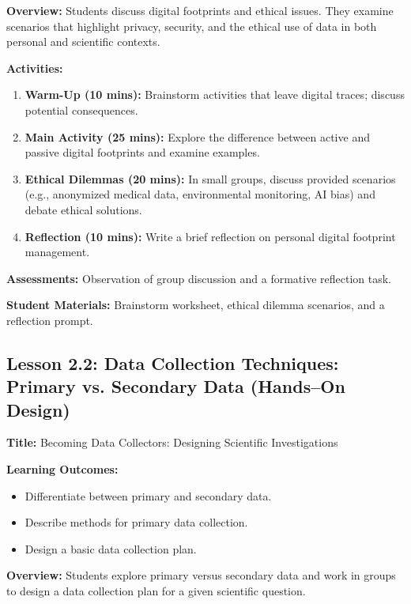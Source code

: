 \documentclass{tufte-book}
\begin{document}
\medskip
\textbf{Overview:}  
Students discuss digital footprints and ethical issues. They examine scenarios that highlight privacy, security, and the ethical use of data in both personal and scientific contexts.

\medskip
\textbf{Activities:}
\begin{enumerate}[label=\arabic*.]
    \item \textbf{Warm-Up (10 mins):} Brainstorm activities that leave digital traces; discuss potential consequences.
    \item \textbf{Main Activity (25 mins):} Explore the difference between active and passive digital footprints and examine examples.
    \item \textbf{Ethical Dilemmas (20 mins):} In small groups, discuss provided scenarios (e.g., anonymized medical data, environmental monitoring, AI bias) and debate ethical solutions.
    \item \textbf{Reflection (10 mins):} Write a brief reflection on personal digital footprint management.
\end{enumerate}

\medskip
\textbf{Assessments:}  
Observation of group discussion and a formative reflection task.

\medskip
\textbf{Student Materials:}  
Brainstorm worksheet, ethical dilemma scenarios, and a reflection prompt.

\subsection{Lesson 2.2: Data Collection Techniques: Primary vs. Secondary Data (Hands--On Design)}
\textbf{Title:} Becoming Data Collectors: Designing Scientific Investigations

\medskip
\textbf{Learning Outcomes:}
\begin{itemize}[leftmargin=*, label={\textbullet}]
    \item Differentiate between primary and secondary data.
    \item Describe methods for primary data collection.
    \item Design a basic data collection plan.
\end{itemize}

\medskip
\textbf{Overview:}  
Students explore primary versus secondary data and work in groups to design a data collection plan for a given scientific question.
\end{document}
